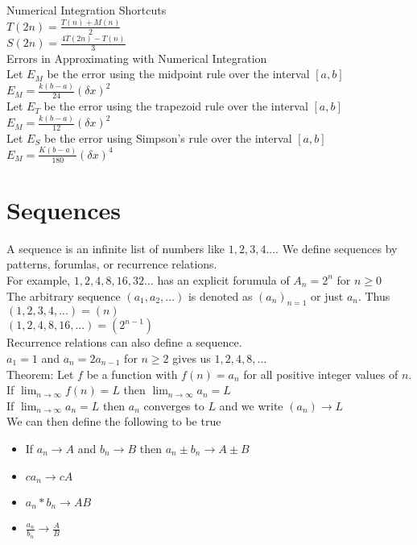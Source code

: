 \documentclass{article}
\begin{document}
\noindent
\Large
Numerical Integration Shortcuts\\
\normalsize
\indent
$T(2n) = \frac{T(n) + M(n)}{2}$\\
$S(2n) = \frac{4T(2n) - T(n)}{3}$\\

\noindent
\Large
Errors in Approximating with Numerical Integration\\
\normalsize
\indent
Let $E_M$ be the error using the midpoint rule over the interval $[a, b]$\\
$E_M = \frac{k(b-a)}{24}(\delta x)^2$\\
Let $E_T$ be the error using the trapezoid rule over the interval $[a, b]$\\
$E_M = \frac{k(b-a)}{12}(\delta x)^2$\\
Let $E_S$ be the error using Simpson's rule over the interval $[a, b]$\\
$E_M = \frac{K(b-a)}{180}(\delta x)^4$\\

\section{Sequences}
A sequence is an infinite list of numbers like $1, 2, 3, 4 ...$. We define sequences by patterns, forumlas, or recurrence relations.\\
For example, $1, 2, 4, 8, 16, 32 ...$ has an explicit forumula of $A_n = 2^n$ for $n \geq 0$\\
The arbitrary sequence $(a_1, a_2, ...)$ is denoted as $(a_n)_{n=1}$ or just $a_n$. Thus\\
$(1, 2, 3, 4, ...) = (n)$\\
$(1, 2, 4, 8, 16, ...) = (2^{n-1})$\\
Recurrence relations can also define a sequence.\\
$a_1 = 1$ and $a_n = 2a_{n-1}$ for $n \geq 2$ gives us $1, 2, 4, 8, ...$\\
Theorem: Let $f$ be a function with $f(n) = a_n$ for all positive integer values of $n$. If $\lim_{n \to \infty} f(n) = L$ then $\lim_{n \to \infty} a_n = L$\\
If $\lim_{n \to \infty} a_n = L$ then $a_n$ converges to $L$ and we write $(a_n) \to L$\\
We can then define the following to be true
\begin{itemize}
  \item If $a_n \to A$ and $b_n \to B$ then $a_n \pm b_n \to A \pm B$
  \item $ca_n \to cA$
  \item $a_n * b_n \to AB$
  \item $\frac{a_n}{b_n} \to \frac{A}{B}$
\end{itemize}
\end{document}

